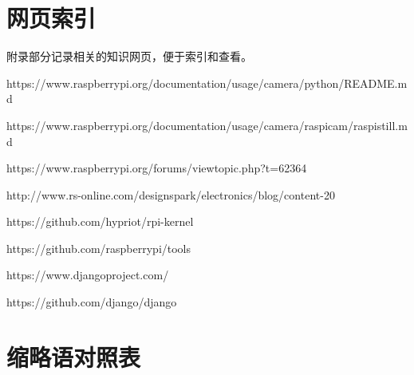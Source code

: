 \chapter{网页索引}

附录部分记录相关的知识网页，便于索引和查看。



https://www.raspberrypi.org/documentation/usage/camera/python/README.md 
   
https://www.raspberrypi.org/documentation/usage/camera/raspicam/raspistill.md

https://www.raspberrypi.org/forums/viewtopic.php?t=62364    

http://www.rs-online.com/designspark/electronics/blog/content-20

https://github.com/hypriot/rpi-kernel    

https://github.com/raspberrypi/tools  

https://www.djangoproject.com/  

https://github.com/django/django

\chapter{缩略语对照表}

